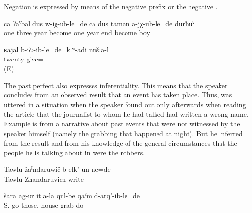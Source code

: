 Negation is expressed by means of the negative prefix   or the negative    .

\begin{exe}
	\ex	\label{ex:‎One boy had turned three, the other was not even one year old analytic}
	\gll	ca	ʡaˁbal	dus	w-iχ-ub-le=de	ca	dus	taman	a-jχ-ub-le=de	durħuˁ\\
		one	three	year	become		one	year	end	become	boy\\
	\glt	{}

	\ex	\label{ex:‎ ‎‎We had not given twenty analytic}
	\gll	ʁajal	b-ičː-ib-le=de=kːʷ-adi	nušːa-l\\
		twenty	give=	\\
	\glt	{} (E)
\end{exe}

The past perfect also expresses inferentiality. This means that the speaker concludes from an observed result that an event has taken place. Thus,  was uttered in a situation when the speaker found out only afterwards when reading the article that the journalist to whom he had talked had written a wrong name. Example  is from a narrative about past events that were not witnessed by the speaker himself (namely the grabbing that happened at night). But he inferred from the result and from his knowledge of the general circumstances that the people he is talking about in  were the robbers.
%
\begin{exe}
	\ex	\label{ex:(He) had (apparently) written Tawlu Zhandaruvich}
	\gll	Tawlu	žaˁndaruwič	b-elk'-un-ne=de\\
		Tawlu	Zhandaruvich	write\\
	\glt	{}

	\ex	\label{ex:‎They went to Shara and had grabbed their houses}
	\gll	šara	ag-ur	itːa-la	qul-be	qaˁm	d-arq'-ib-le=de\\
		S.	go	those.	house	grab	do\\
	\glt	{}
\end{exe}

